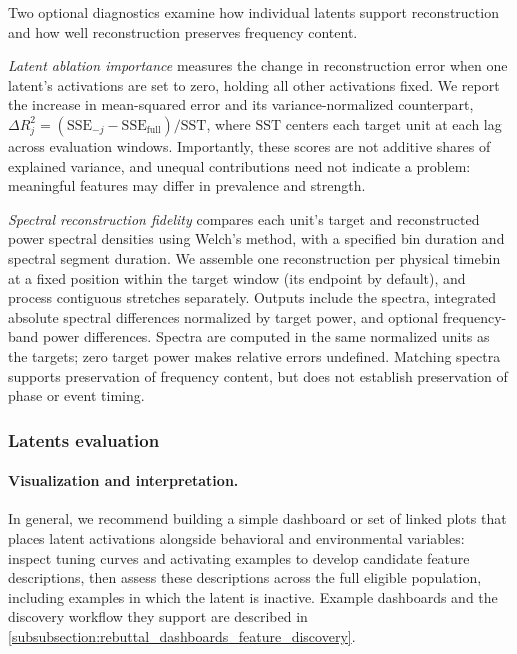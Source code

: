 Two optional diagnostics examine how individual latents support reconstruction and how well reconstruction preserves frequency content. 

\textit{Latent ablation importance} measures the change in reconstruction error when one latent's activations are set to zero, holding all other activations fixed. We report the increase in mean-squared error and its variance-normalized counterpart, $\Delta R_j^2=(\mathrm{SSE}_{-j}-\mathrm{SSE}_{\mathrm{full}})/\mathrm{SST}$, where $\mathrm{SST}$ centers each target unit at each lag across evaluation windows. Importantly, these scores are not additive shares of explained variance, and unequal contributions need not indicate a problem: meaningful features may differ in prevalence and strength.

\textit{Spectral reconstruction fidelity} compares each unit's target and reconstructed power spectral densities using Welch's method, with a specified bin duration and spectral segment duration. We assemble one reconstruction per physical timebin at a fixed position within the target window (its endpoint by default), and process contiguous stretches separately. Outputs include the spectra, integrated absolute spectral differences normalized by target power, and optional frequency-band power differences. Spectra are computed in the same normalized units as the targets; zero target power makes relative errors undefined. Matching spectra supports preservation of frequency content, but does not establish preservation of phase or event timing.

\subsubsection{Latents evaluation}
\label{subsubsection:latents_evaluation_details}

\paragraph{Visualization and interpretation.}
In general, we recommend building a simple dashboard or set of linked plots that places latent activations alongside behavioral and environmental variables: inspect tuning curves and activating examples to develop candidate feature descriptions, then assess these descriptions across the full eligible population, including examples in which the latent is inactive. Example dashboards and the discovery workflow they support are described in \hyperref[subsubsection:rebuttal_dashboards_feature_discovery]{\ref*{subsubsection:rebuttal_dashboards_feature_discovery}}.

